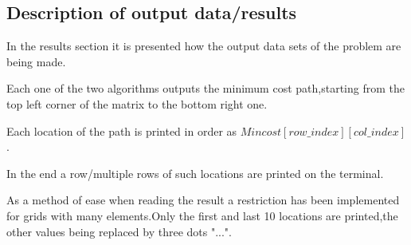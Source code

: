 \documentclass{article}
\begin{document}
\subsection{Description of output data/results}
\par In the results section it is presented how the output data sets of the problem
are being made.
\par Each one of the two algorithms outputs the minimum cost path,starting from the top left corner
of the matrix to the bottom right one.
\par Each location of the path is printed in order as  $Mincost[row\_index][col\_index]$.
\par In the end a row/multiple rows of such locations are printed on the terminal.
\par As a method of ease when reading the result a restriction has been implemented
for grids with many elements.Only the first and last 10 locations are printed,the other values being replaced by three dots "...".
\newpage
\end{document}
